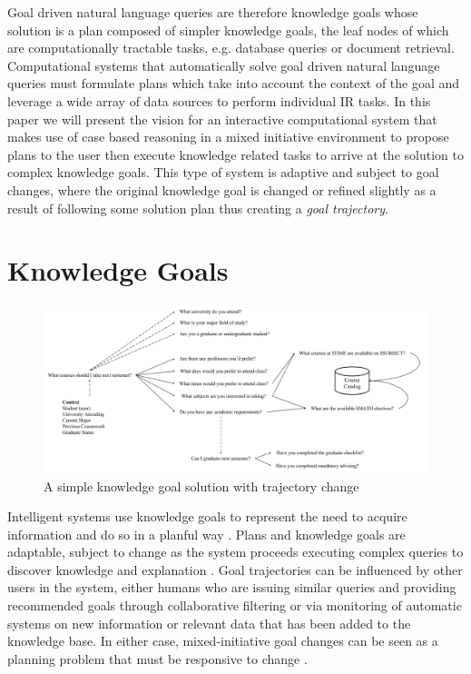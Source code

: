 \documentclass[11pt,letterpaper]{article}
\begin{document}
Goal driven natural language queries are therefore knowledge goals whose solution is a plan composed of simpler knowledge goals, the leaf nodes of which are computationally tractable tasks, e.g. database queries or document retrieval. Computational systems that automatically solve goal driven natural language queries must formulate plans which take into account the context of the goal and leverage a wide array of data sources to perform individual IR tasks. In this paper we will present the vision for an interactive computational system that makes use of case based reasoning in a mixed initiative environment to propose plans to the user then execute knowledge related tasks to arrive at the solution to complex knowledge goals. This type of system is adaptive and subject to goal changes, where the original knowledge goal is changed or refined slightly as a result of following some solution plan thus creating a \textit{goal trajectory}.

\section{Knowledge Goals}

\begin{figure}
	\centering
	    \includegraphics[width=\textwidth]{figures/simple_trajectory.png}
    \caption{\label{fig:simple_trajectory.png}A simple knowledge goal solution with trajectory change}
\end{figure}

Intelligent systems use knowledge goals to represent the need to acquire information and do so in a planful way \cite{ram_goal-based_1991}. Plans and knowledge goals are adaptable, subject to change as the system proceeds executing complex queries to discover knowledge and explanation \cite{munoz-avila_case-based_2008}. Goal trajectories can be influenced by other users in the system, either humans who are issuing similar queries and providing recommended goals through collaborative filtering \cite{hayes_case-based_2001} or via monitoring of automatic systems on new information or relevant data that has been added to the knowledge base. In either case, mixed-initiative goal changes can be seen as a planning problem that must be responsive to change \cite{cox_mixed-initiative_2007}.
\end{document}
